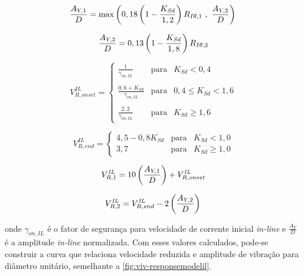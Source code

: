 \begin{equation}
\label{eq:viv-Vronset}
\frac{A_{Y,1}}{D} = \max\left(0,18 \left(1 - \frac{K_\mathit{Sd}}{1,2}\right) R_{I\theta,1} ~,~\frac{A_{Y,2}}{D}\right)\\
\end{equation}

\begin{equation}
\frac{A_{Y,2}}{D} = 0,13 \left(1 - \frac{K_\mathit{Sd}}{1,8}\right) R_{I\theta,2}\\
\end{equation}

\begin{equation}
V_{R,\mathit{onset}}^\mathit{IL} = \left\{
\begin{matrix}
\frac{1}{ \gamma_{\mathit{on}, \mathit{IL}} }               & \mathrm{para} & K_\mathit{Sd} < 0,4\\
\\
\frac{0,6 + K_\mathit{Sd}}{\gamma_{\mathit{on}, \mathit{IL}}} & \mathrm{para} & 0,4 \leq K_\mathit{Sd} < 1,6 \\
\\
\frac{2,2}{\gamma_{\mathit{on}, \mathit{IL}}}                 & \mathrm{para} & K_\mathit{Sd} \geq 1,6
\end{matrix}
\right.
\end{equation}

\begin{equation}
V_{R, \mathit{end}}^\mathit{IL} = \left\{
\begin{array}{ccc}
4,5 - 0,8 K_\mathit{Sd} & \mathrm{para} & K_\mathit{Sd} < 1,0 \\
3,7                     & \mathrm{para} & K_\mathit{Sd} \geq 1,0 
\end{array}
\right.
\end{equation}

\begin{equation}
V_{R, 1}^\mathit{IL} = 10 \left(\frac{A_{Y, 1}}{D}\right)+ V_{R,\mathit{onset}}^\mathit{IL}\\
\end{equation}

\begin{equation}
V_{R, 2}^\mathit{IL} =  V_{R, \mathit{end}}^\mathit{IL} - 2 \left(\frac{A_{Y, 2}}{D}\right)\\
\end{equation}

onde $\gamma_{\mathit{on}, \mathit{IL}}$ é o fator de segurança para velocidade de corrente inicial \textit{in-line} e $\frac{A_Y}{D}$ é a amplitude \textit{in-line} normalizada. Com esses valores calculados, pode-se construir a curva que relaciona velocidade reduzida e amplitude de vibração para diâmetro unitário, semelhante a \autoref{fig:viv-responsemodelil}.

